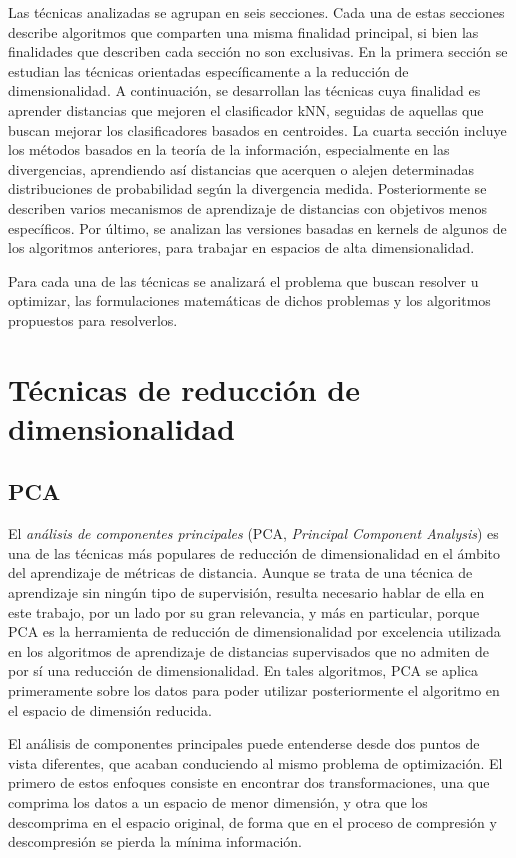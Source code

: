 \documentclass{book}
\begin{document}
Las técnicas analizadas se agrupan en seis secciones. Cada una de estas secciones describe algoritmos que comparten una misma finalidad principal, si bien las finalidades que describen cada sección no son exclusivas. En la primera sección se estudian las técnicas orientadas específicamente a la reducción de dimensionalidad. A continuación, se desarrollan las técnicas cuya finalidad es aprender distancias que mejoren el clasificador kNN, seguidas de aquellas que buscan mejorar los clasificadores basados en centroides. La cuarta sección incluye los métodos basados en la teoría de la información, especialmente en las divergencias, aprendiendo así distancias que acerquen o alejen determinadas distribuciones de probabilidad según la divergencia medida. Posteriormente se describen varios mecanismos de aprendizaje de distancias con objetivos menos específicos. Por último, se analizan las versiones basadas en kernels de algunos de los algoritmos anteriores, para trabajar en espacios de alta dimensionalidad.

Para cada una de las técnicas se analizará el problema que buscan resolver u optimizar, las formulaciones matemáticas de dichos problemas y los algoritmos propuestos para resolverlos.

\section{Técnicas de reducción de dimensionalidad}

\subsection{PCA}

El \emph{análisis de componentes principales} (PCA, \emph{Principal Component Analysis}) es una de las técnicas más populares de reducción de dimensionalidad en el ámbito del aprendizaje de métricas de distancia. Aunque se trata de una técnica de aprendizaje sin ningún tipo de supervisión, resulta necesario hablar de ella en este trabajo, por un lado por su gran relevancia, y más en particular, porque PCA es la herramienta de reducción de dimensionalidad por excelencia utilizada en los algoritmos de aprendizaje de distancias supervisados que no admiten de por sí una reducción de dimensionalidad. En tales algoritmos, PCA se aplica primeramente sobre los datos para poder utilizar posteriormente el algoritmo en el espacio de dimensión reducida.

El análisis de componentes principales puede entenderse desde dos puntos de vista diferentes, que acaban conduciendo al mismo problema de optimización. El primero de estos enfoques consiste en encontrar dos transformaciones, una que comprima los datos a un espacio de menor dimensión, y otra que los descomprima en el espacio original, de forma que en el proceso de compresión y descompresión se pierda la mínima información.
\end{document}
